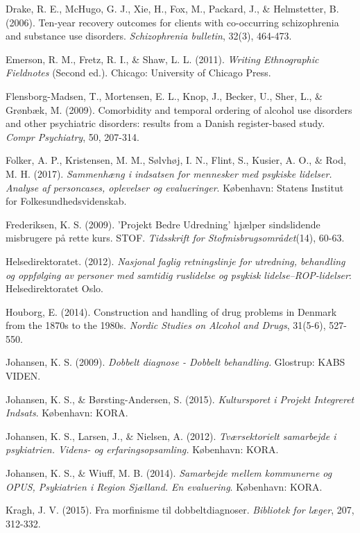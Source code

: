 \begin{thebibliography}{99}
\item Drake, R. E., McHugo, G. J., Xie, H., Fox, M., Packard, J., \& Helmstetter, B. (2006). Ten-year recovery outcomes for clients with co-occurring schizophrenia and substance use disorders. \textit{Schizophrenia bulletin}, 32(3), 464-473. 
\item Emerson, R. M., Fretz, R. I., \& Shaw, L. L. (2011).\textit{ Writing Ethnographic Fieldnotes} (Second ed.). Chicago: University of Chicago Press.
\item Flensborg-Madsen, T., Mortensen, E. L., Knop, J., Becker, U., Sher, L., \& Grønbæk, M. (2009). Comorbidity and temporal ordering of alcohol use disorders and other psychiatric disorders: results from a Danish register-based study. \textit{Compr Psychiatry}, 50, 207-314. 
\item Folker, A. P., Kristensen, M. M., Sølvhøj, I. N., Flint, S., Kusier, A. O., \& Rod, M. H. (2017). \textit{Sammenhæng i indsatsen for mennesker med psykiske lidelser. Analyse af personcases, oplevelser og evalueringer}. København: Statens Institut for Folkesundhedsvidenskab.
\item Frederiksen, K. S. (2009). ’Projekt Bedre Udredning’ hjælper sindslidende misbrugere på rette kurs. STOF. \textit{Tidsskrift for Stofmisbrugsområdet}(14), 60-63. 
\item Helsedirektoratet. (2012). \textit{Nasjonal faglig retningslinje for utredning, behandling og oppfølging av personer med samtidig ruslidelse og psykisk lidelse–ROP-lidelser}: Helsedirektoratet Oslo.
\item Houborg, E. (2014). Construction and handling of drug problems in Denmark from the 1870s to the 1980s. \textit{Nordic Studies on Alcohol and Drugs}, 31(5-6), 527-550. 
\item Johansen, K. S. (2009). \textit{Dobbelt diagnose - Dobbelt behandling.} Glostrup: KABS VIDEN.
\item Johansen, K. S., \& Børsting-Andersen, S. (2015). \textit{Kultursporet i Projekt Integreret Indsats}. København: KORA.
\item Johansen, K. S., Larsen, J., \& Nielsen, A. (2012). \textit{Tværsektorielt samarbejde i psykiatrien. Videns- og erfaringsopsamling.} København: KORA.
\item Johansen, K. S., \& Wiuff, M. B. (2014). \textit{Samarbejde mellem kommunerne og OPUS, Psykiatrien i Region Sjælland. En evaluering}. København: KORA.
\item Kragh, J. V. (2015). Fra morfinisme til dobbeltdiagnoser. \textit{Bibliotek for læger}, 207, 312-332. 

\end{thebibliography}
